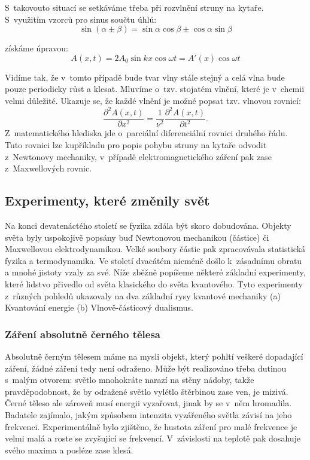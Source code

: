 \noindent S~takovouto situací se setkáváme třeba při rozvlnění struny na kytaře. S~využitím vzorců pro sinus součtu úhlů:
\begin{equation}
\sin(\alpha \pm \beta) = \sin \alpha\cos\beta \pm \cos\alpha\sin\beta
\label{rov:Vlna7}
\end{equation}

\noindent získáme úpravou:
\begin{equation}
A(x,t)=2A_0\sin kx \cos \omega t = A'(x)\cos \omega t \mbox{}
\label{rov:Vlna8}
\end{equation}

\noindent Vidíme tak, že v~tomto případě bude tvar vlny stále stejný a celá vlna bude pouze periodicky růst a klesat. Mluvíme o~tzv. stojatém vlnění, které je v~chemii velmi důležité. Ukazuje se, že každé vlnění je možné popsat tzv. vlnovou rovnicí:
\begin{equation}
\frac{\partial ^2A(x,t)}{\partial x^2} = \frac{1}{\nu^2}\frac{\partial^2A(x,t)}{\partial t^2}\mbox{.}
\label{rov:Vlna9}
\end{equation}
Z~matematického hlediska jde o~parciální diferenciální rovnici druhého řádu. Tuto rovnici lze kupříkladu pro popis pohybu struny na kytaře odvodit z~Newtonovy mechaniky, v~případě elektromagnetického záření pak zase z~Maxwellových rovnic. 

\subsection{Experimenty, které změnily svět}

Na konci devatenáctého století se fyzika zdála být skoro dobudována. Objekty světa byly uspokojivě popsány buď Newtonovou mechanikou (částice) či Maxwellovou elektrodynamikou. Velké soubory částic pak zpracovávala statistická fyzika a termodynamika. Ve století dvacátém nicméně došlo k~zásadnímu obratu a mnohé jistoty vzaly za své. Níže zběžně popíšeme některé základní experimenty, které lidstvo přivedlo od světa klasického do světa kvantového. Tyto experimenty z~různých pohledů ukazovaly na dva základní rysy kvantové mechaniky (a) Kvantování energie (b) Vlnově-částicový dualismus.

\subsubsection{Záření absolutně černého tělesa}

Absolutně černým tělesem máme na mysli objekt, který pohltí veškeré dopadající záření, žádné záření tedy není odraženo. Může být realizováno třeba dutinou s~malým otvorem: světlo mnohokráte narazí na stěny nádoby, takže pravděpodobnost, že by odražené světlo vylétlo štěrbinou zase ven, je mizivá. Černé těleso ale zároveň musí energii vyzařovat, jinak by se v~něm hromadila. Badatele zajímalo, jakým způsobem intenzita vyzářeného světla závisí na jeho frekvenci. Experimentálně bylo zjištěno, že hustota záření pro malé frekvence je velmi malá a roste se zvyšující se frekvencí. V~závislosti na teplotě pak dosahuje svého maxima a posléze zase klesá. 

